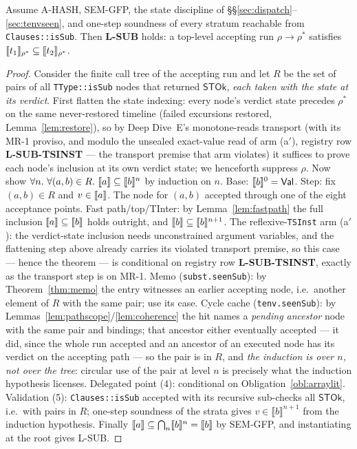 \documentclass[11pt]{article}
\newcommand{\STOk}{\mathsf{STOk}}
\newcommand{\semn}[2]{\llbracket #1 \rrbracket^{#2}}
\begin{document}
\begin{theorem}
\label{thm:coind}
Assume A-HASH, SEM-GFP, the state discipline of
\S\S\ref{sec:dispatch}--\ref{sec:tenvseen}, and one-step soundness of
every stratum reachable from \texttt{Clauses::isSub}. Then \textbf{L-SUB}
holds: a top-level accepting run $\rho \to \rho^\ast$ satisfies
$\llbracket t_1 \rrbracket_{\rho^\ast} \subseteq \llbracket t_2 \rrbracket_{\rho^\ast}$.
\end{theorem}
\begin{proof}
Consider the finite call tree of the accepting run and let $R$ be the set
of pairs of all \texttt{TType::isSub} nodes that returned $\STOk$,
\emph{each taken with the state at its verdict}. First flatten the state
indexing: every node's verdict state precedes $\rho^\ast$ on the same
never-restored timeline (failed excursions restored,
Lemma~\ref{lem:restore}), so by Deep Dive~E's monotone-reads transport
(with its MR-1 proviso, and modulo the unsealed exact-value read of arm
(a$'$), registry row \textbf{L-SUB-TSINST} --- the transport premise
that arm violates) it suffices to prove each node's inclusion at its
own verdict state; we henceforth suppress $\rho$.
Now show $\forall n.\ \forall (a,b) \in R.\ \sem{a} \subseteq \semn{b}{n}$
by induction on $n$. Base: $\semn{b}{0} = \Val$. Step: fix
$(a,b) \in R$ and $v \in \llbracket a \rrbracket$. The node for $(a,b)$ accepted through
one of the eight acceptance points. Fast path/top/TInter: by
Lemma~\ref{lem:fastpath} the full inclusion $\llbracket a \rrbracket \subseteq \llbracket b \rrbracket$
holds outright, and $\sem{b} \subseteq \semn{b}{n+1}$. The
reflexive-\texttt{TSInst} arm (a$'$): the verdict-state inclusion needs
unconstrained argument variables, and the flattening step above already
carries its violated transport premise, so this case --- hence the
theorem --- is conditional on registry row \textbf{L-SUB-TSINST},
exactly as the transport step is on MR-1.
Memo (\texttt{subst.seenSub}): by Theorem~\ref{thm:memo} the entry
witnesses an earlier accepting node, i.e.\ another element of $R$ with
the same pair; use its case.
Cycle cache (\texttt{tenv.seenSub}): by
Lemmas~\ref{lem:pathscope}/\ref{lem:coherence} the hit names a
\emph{pending ancestor} node with the same pair and bindings; that
ancestor either eventually accepted --- it did, since the whole run
accepted and an ancestor of an executed node has its verdict on the
accepting path --- so the pair is in $R$, and \emph{the induction is over
$n$, not over the tree}: circular use of the pair at level $n$ is
precisely what the induction hypothesis licenses.
Delegated point (4): conditional on Obligation~\ref{obl:arraylit}.
Validation (5): \texttt{Clauses::isSub} accepted with its recursive
sub-checks all $\STOk$, i.e.\ with pairs in $R$; one-step soundness of
the strata gives $v \in \semn{b}{n+1}$ from the induction hypothesis.
Finally $\sem{a} \subseteq \bigcap_n \semn{b}{n} = \sem{b}$ by SEM-GFP,
and instantiating at the root gives L-SUB.
\end{proof}
\end{document}
